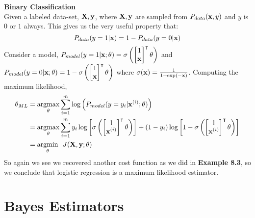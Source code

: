 \begin{example}
    \textbf{Binary Classification}\\
     \indent Given a labeled data-set, $\MX, \vy$, where $\MX, \vy$ are sampled from $P_{data}(\vx,y)$ and $y$ is $0$ or $1$ always. This gives us the very useful property that: 
    $$P_{data}(y=1|\vx) = 1-P_{data}(y=0|\vx)$$
    Consider a model, $P_{model}(y=1|\vx;\vtheta) = \sigma\left( \begin{bmatrix}1 \\ \vx \end{bmatrix}^\intercal \vtheta\right)$ and $P_{model}(y=0|\vx;\vtheta) = 1-\sigma\left( \begin{bmatrix}1 \\ \vx \end{bmatrix}^\intercal \vtheta\right)$  where $\sigma(\vx) = \frac{1}{1+\exp(-\vx)}$.
    Computing the maximum likelihood, 
    \begin{align*}
        \vtheta_{ML} &= \underset{\vtheta}{\argmax}\sum_{i=1}^m\log\left(P_{model}(y = y_i|\vx^{(i)};\vtheta) \right)\\
        &=\underset{\vtheta}{\argmax}\sum_{i=1}^my_i\log\left[\sigma\left( \begin{bmatrix}1 \\ \vx^{(i)} \end{bmatrix}^\intercal \vtheta\right) \right]+(1-y_i)\log\left[1-\sigma\left( \begin{bmatrix}1 \\ \vx^{(i)} \end{bmatrix}^\intercal \vtheta\right) \right] \\
        &= \underset{\vtheta}{\argmin} \ \ J(\MX, \vy; \theta)
    \end{align*}
    So again we see we recovered another cost function as we did in \textbf{Example 8.3}, so we conclude that logistic regression is a maximum likelihood estimator. 
\end{example}


\section{Bayes Estimators}

